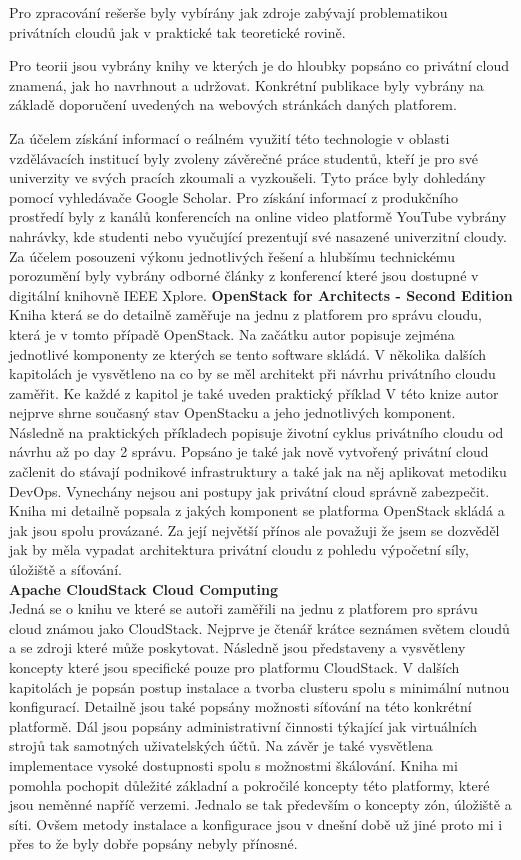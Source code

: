 \documentclass[twoside, 12pt]{article}
\begin{document}
Pro zpracování rešerše byly vybírány jak zdroje  zabývají problematikou privátních cloudů jak v praktické tak teoretické rovině. 

Pro teorii jsou vybrány knihy ve kterých je do hloubky popsáno co privátní cloud znamená, jak ho navrhnout a udržovat. Konkrétní publikace byly vybrány na základě doporučení uvedených na webových stránkách daných platforem. 

Za účelem získání informací o reálném využití této technologie v oblasti vzdělávacích institucí byly zvoleny závěrečné práce studentů, kteří je pro své univerzity ve svých pracích zkoumali a vyzkoušeli. Tyto práce byly dohledány pomocí vyhledávače Google Scholar. Pro získání informací z produkčního prostředí byly z kanálů konferencích na online video platformě YouTube vybrány nahrávky, kde studenti nebo vyučující prezentují své nasazené univerzitní cloudy. Za účelem posouzeni výkonu jednotlivých řešení a hlubšímu technickému porozumění byly vybrány odborné články z konferencí které jsou dostupné v digitální knihovně IEEE Xplore.
\textbf{OpenStack for Architects - Second Edition} \\
Kniha která se do detailně zaměřuje na jednu z platforem pro správu cloudu, která je v tomto případě OpenStack. Na začátku autor popisuje zejména jednotlivé komponenty ze kterých se tento software skládá. V několika dalších kapitolách je vysvětleno na co by se měl architekt při návrhu privátního cloudu zaměřit. Ke každé z kapitol je také uveden praktický příklad
V této knize autor nejprve shrne současný stav OpenStacku a jeho jednotlivých komponent. Následně na praktických příkladech popisuje životní cyklus privátního cloudu od návrhu až po day 2 správu. Popsáno je také jak nově vytvořený privátní cloud začlenit do stávají podnikové infrastruktury a také jak na něj aplikovat metodiku DevOps. Vynechány nejsou ani postupy jak privátní cloud správně zabezpečit. \cite{architects} Kniha mi detailně popsala z jakých komponent se platforma OpenStack skládá a jak jsou spolu provázané. Za její největší přínos ale považuji že jsem se dozvěděl jak by měla vypadat architektura privátní cloudu z pohledu výpočetní síly, úložiště a síťování.\\
\textbf{Apache CloudStack Cloud Computing} \\
Jedná se o knihu ve které se autoři zaměřili na jednu z platforem pro správu cloud známou jako CloudStack. Nejprve je čtenář krátce seznámen světem cloudů a se zdroji které může poskytovat. Následně jsou představeny a vysvětleny koncepty které jsou specifické pouze pro platformu CloudStack. V dalších kapitolách je popsán postup instalace a tvorba clusteru spolu s minimální nutnou konfigurací. Detailně jsou také popsány možnosti síťování na této konkrétní platformě. Dál jsou popsány administrativní činnosti týkající jak virtuálních strojů tak samotných uživatelských účtů. Na závěr je také vysvětlena implementace vysoké dostupnosti spolu s možnostmi škálování. \cite{apachebook} Kniha mi pomohla pochopit důležité základní a pokročilé koncepty této platformy, které jsou neměnné napříč verzemi. Jednalo se tak především o koncepty zón, úložiště a síti. Ovšem metody instalace a konfigurace jsou v dnešní době už jiné proto mi i přes to že byly dobře popsány nebyly přínosné.  
\end{document}

